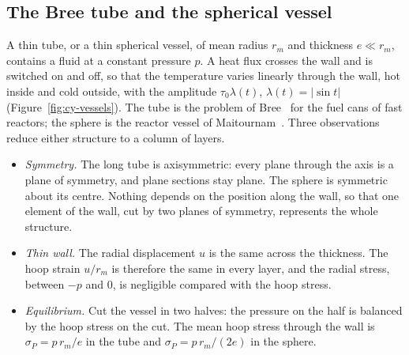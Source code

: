 \subsection{The Bree tube and the spherical vessel}\label{ssec:cy-bree}
%
A thin tube, or a thin spherical vessel, of mean radius $r_m$ and thickness
$e\ll r_m$, contains a fluid at a constant pressure $p$. A heat flux crosses
the wall and is switched on and off, so that the temperature varies linearly
through the wall, hot inside and cold outside, with the amplitude
$\tau_0\lambda(t)$, $\lambda(t)=|\sin t|$ (Figure~\ref{fig:cy-vessels}). The
tube is the problem of Bree~\cite{Bree1967} for the fuel cans of fast reactors;
the sphere is the reactor vessel of Maitournam~\cite[Sec.~4.5]{Maitournam2012c}.
Three observations reduce either structure to a column of layers.
\begin{itemize}
  \item \emph{Symmetry.} The long tube is axisymmetric: every plane through the
  axis is a plane of symmetry, and plane sections stay plane. The sphere is
  symmetric about its centre. Nothing depends on the position along the wall,
  so that one element of the wall, cut by two planes of symmetry, represents
  the whole structure.
  \item \emph{Thin wall.} The radial displacement $u$ is the same across the
  thickness. The hoop strain $u/r_m$ is therefore the same in every layer,
  and the radial stress, between $-p$ and $0$, is negligible compared with the
  hoop stress.
  \item \emph{Equilibrium.} Cut the vessel in two halves: the pressure on the
  half is balanced by the hoop stress on the cut. The mean hoop stress through
  the wall is $\sigma_P=p\,r_m/e$ in the tube and $\sigma_P=p\,r_m/(2e)$ in the
  sphere.
\end{itemize}

